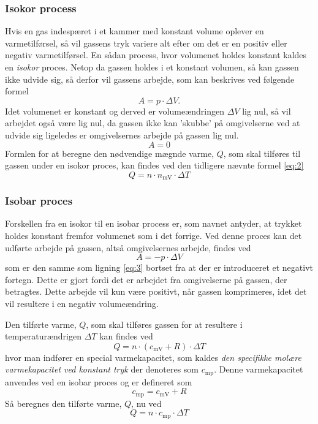 \documentclass[12pt,a4paper]{article}
\begin{document}
			\subsubsection{Isokor process} 
			Hvis en gas indespæret i et kammer med konstant volume oplever en varmetilførsel, så vil 
			gassens tryk variere alt efter om det er en positiv eller negativ varmetilførsel. En sådan
			process, hvor volumenet holdes konstant kaldes en \textit{isokor} proces. Netop da gassen
			holdes i et konstant volumen, så kan gassen ikke udvide sig, så derfor vil gassens arbejde,
			som kan beskrives ved følgende formel
			\begin{equation}
				A = p \cdot \Delta V.
				\label{eq:3}
			\end{equation}
			Idet volumenet er konstant og derved er volumeændringen \(\Delta V\) lig nul, så vil arbejdet
			også være lig nul, da gassen ikke kan 'skubbe' på omgivelserne ved at udvide sig ligeledes er 
			omgivelsernes arbejde på gassen lig nul.
			\begin{equation}
				A = 0
			\end{equation}
			Formlen for at beregne den nødvendige mægnde varme, \(Q\), som skal tilføres til gassen under 
			en isokor proces, kan findes ved den tidligere nævnte formel \eqref{eq:2}
			\begin{equation}
				Q = n \cdot n_{\text{mV}} \cdot \Delta T
			\end{equation}
			
			\subsubsection{Isobar proces}
			Forskellen fra en isokor til en isobar process er, som
			navnet antyder, at trykket 
			holdes konstant fremfor volumenet som i det forrige. Ved
			denne proces kan det udførte arbejde på gassen, altså 
			omgivelsernes arbejde, findes ved
			\begin{equation}
				A = -p \cdot \Delta V
			\end{equation}
			som er den samme som ligning \eqref{eq:3} bortset fra at
			der er introduceret et negativt fortegn. Dette er gjort fordi det er arbejdet fra omgivelserne 
			på gassen, der betragtes. Dette arbejde vil kun være positivt, når gassen komprimeres, idet det 
			vil resultere i en negativ volumeændring.  
			
			Den tilførte varme, \(Q\), som skal tilføres gassen for at 
			resultere i temperaturændrigen \(\Delta T\) kan findes ved
			\begin{equation}
				Q = n \cdot (c_{\text{mV}} + R) \cdot \Delta T
			\end{equation} 
			hvor man indfører en special varmekapacitet, som kaldes \textit{den specifikke molære varmekapacitet ved konstant tryk} der denoteres som \(c_{\text{mp}}\). Denne varmekapacitet anvendes ved en isobar proces og er defineret som
			\begin{equation}
				c_{\text{mp}} = c_{\text{mV}} + R
			\end{equation}
			Så beregnes den tilførte varme, \(Q\), nu ved
			\begin{equation}
				Q = n \cdot c_{\text{mp}} \cdot \Delta T
			\end{equation}
\end{document}
